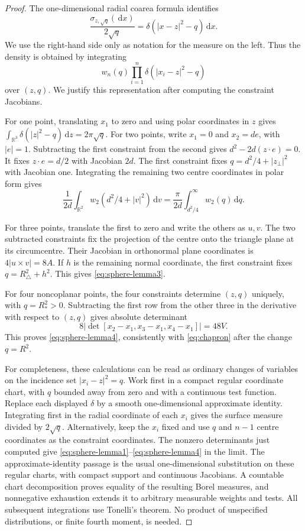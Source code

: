 \documentclass[11pt,a4paper]{article}
\numberwithin{equation}{section}
\theoremstyle{definition}
\theoremstyle{remark}
\newcommand{\R}{\mathbb R}
\newcommand{\dd}{\,\mathrm d}
\begin{document}
\begin{proof}
The one-dimensional radial coarea formula identifies
\[
 \frac{\sigma_{z,\sqrt q}(\dd x)}{2\sqrt q}
 =\delta(|x-z|^2-q)\dd x.
\]
We use the right-hand side only as notation for the measure on the left.
Thus the density is obtained by integrating
\begin{equation}
 w_n(q)\prod_{i=1}^n\delta(|x_i-z|^2-q)
 \label{eq:incidence}
\end{equation}
over $(z,q)$. We justify this representation after computing the
constraint Jacobians.

For one point, translating $x_1$ to zero and using polar coordinates in
$z$ gives
$\int_{\R^3}\delta(|z|^2-q)\dd z=2\pi\sqrt q$.
For two points, write $x_1=0$ and $x_2=de$, with $|e|=1$. Subtracting the
first constraint from the second gives $d^2-2d(z\cdot e)=0$.
It fixes $z\cdot e=d/2$ with Jacobian $2d$. The first constraint fixes
$q=d^2/4+|z_\perp|^2$ with Jacobian one. Integrating the remaining two
centre coordinates in polar form gives
\[
 \frac1{2d}\int_{\R^2}w_2(d^2/4+|v|^2)\dd v
 =\frac\pi{2d}\int_{d^2/4}^\infty w_2(q)\dd q.
\]

For three points, translate the first to zero and write the others as
$u,v$. The two subtracted constraints fix the projection of the centre
onto the triangle plane at its circumcentre. Their Jacobian in orthonormal
plane coordinates is $4|u\times v|=8A$. If $h$ is the remaining normal
coordinate, the first constraint fixes $q=R_\triangle^2+h^2$.
This gives \eqref{eq:sphere-lemma3}.

For four noncoplanar points, the four constraints determine $(z,q)$
uniquely, with $q=R_*^2>0$. Subtracting the first row from the other three
in the derivative with respect to $(z,q)$ gives absolute determinant
\begin{equation}
 8\left|\det[x_2-x_1,x_3-x_1,x_4-x_1]\right|=48V.
 \label{eq:48V}
\end{equation}
This proves \eqref{eq:sphere-lemma4}, consistently with
\eqref{eq:chapron} after the change $q=R^2$.

For completeness, these calculations can be read as ordinary changes of
variables on the incidence set $|x_i-z|^2=q$. Work first in a compact
regular coordinate chart, with $q$ bounded away from zero and with a
continuous test function. Replace each displayed $\delta$ by a smooth
one-dimensional approximate identity. Integrating first in the radial
coordinate of each $x_i$ gives the surface measure divided by $2\sqrt q$.
Alternatively, keep the $x_i$ fixed and use $q$ and $n-1$ centre coordinates
as the constraint coordinates. The nonzero determinants just computed
give \eqref{eq:sphere-lemma1}--\eqref{eq:sphere-lemma4} in the limit. The
approximate-identity passage is the usual one-dimensional substitution
on these regular charts, with compact support and continuous Jacobians.
A countable chart decomposition proves equality of the resulting Borel
measures, and nonnegative exhaustion extends it to arbitrary measurable
weights and tests. All subsequent integrations use Tonelli's theorem.
No product of unspecified distributions, or finite fourth moment, is
needed.
\end{proof}
\end{document}
